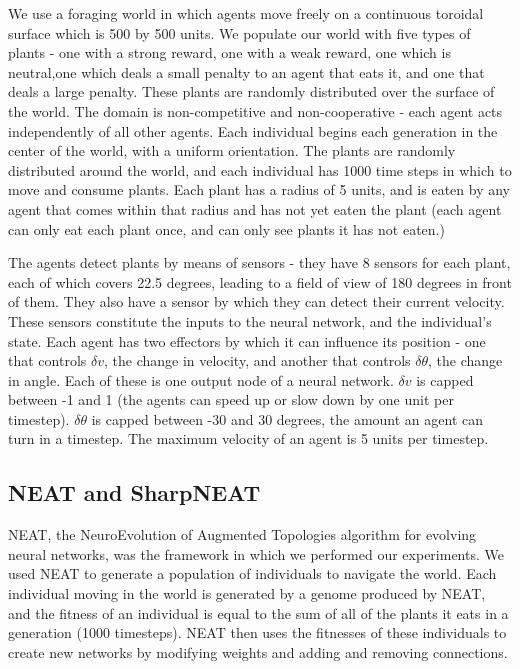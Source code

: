 \documentclass{acm_proc_article-sp}
\begin{document}
    We use a foraging world in which agents move freely on a continuous toroidal surface which is 500 by 500 units.  
We populate our world with five types of plants - one with a strong reward, one with a weak reward, one which is neutral,one which deals a small penalty to an agent that eats it, and one that deals a large penalty.  
These plants are randomly distributed over the surface of the world.
  The domain is non-competitive and non-cooperative - each agent acts independently of all other agents.
  Each individual begins each generation in the center of the world, with a uniform orientation.
  The plants are randomly distributed around the world, and each individual has 1000 time steps in which to move and consume plants.
  Each plant has a radius of 5 units, and is eaten by any agent that comes within that radius and has not yet eaten the plant (each agent can only eat each plant once, and can only see plants it has not eaten.)
  
 The agents detect plants by means of sensors - they have 8 sensors for each plant, each of which covers 22.5 degrees, leading to a field of view of 180 degrees in front of them.
   They also have a sensor by which they can detect their current velocity.
   These sensors constitute the inputs to the neural network, and the individual's state.
Each agent has two effectors by which it can influence its position - one that controls $\delta v$, the change in velocity, and another that controls $\delta \theta$, the change in angle.
Each of these is one output node of a neural network.
  $\delta v$ is capped between -1 and 1 (the agents can speed up or slow down by one unit per timestep).
  $\delta \theta$ is capped between -30 and 30 degrees, the amount an agent can turn in a timestep.
  The maximum velocity of an agent is 5 units per timestep.
\subsection*{NEAT and SharpNEAT}
NEAT, the NeuroEvolution of Augmented Topologies algorithm for evolving neural networks, was the framework in which we performed our experiments.  
We used NEAT to generate a population of individuals to navigate the world.  
Each individual moving in the world is generated by a genome produced by NEAT, and the fitness of an individual is equal to the sum of all of the plants it eats in a generation (1000 timesteps).
NEAT then uses the fitnesses of these individuals to create new networks by modifying weights and adding and removing connections.
\end{document}
